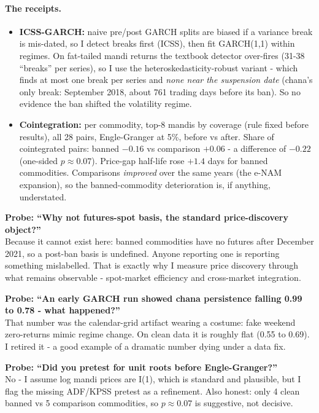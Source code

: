 \documentclass[11pt]{article}
\newcommand{\Q}[1]{\smallskip\noindent\textbf{Probe: #1}\\}
\begin{document}
\paragraph{The receipts.}
\begin{itemize}[leftmargin=1.6em,itemsep=1pt]
  \item \textbf{ICSS-GARCH:} naive pre/post GARCH splits are biased if a variance break is
        mis-dated, so I detect breaks first (ICSS), then fit GARCH(1,1) within regimes.
        On fat-tailed mandi returns the textbook detector over-fires (31-38 ``breaks'' per
        series), so I use the heteroskedasticity-robust variant - which finds at most one
        break per series and \emph{none near the suspension date} (chana's only break:
        September 2018, about 761 trading days before its ban). So no evidence the ban
        shifted the volatility regime.
  \item \textbf{Cointegration:} per commodity, top-8 mandis by coverage (rule fixed before
        results), all 28 pairs, Engle-Granger at 5\%, before vs after. Share of
        cointegrated pairs: banned $-0.16$ vs comparison $+0.06$ - a difference of
        $-0.22$ (one-sided $p\approx0.07$). Price-gap half-life rose $+1.4$ days for
        banned commodities. Comparisons \emph{improved} over the same years (the e-NAM
        expansion), so the banned-commodity deterioration is, if anything, understated.
\end{itemize}

\Q{``Why not futures-spot basis, the standard price-discovery object?''}
Because it cannot exist here: banned commodities have no futures after December 2021, so a
post-ban basis is undefined. Anyone reporting one is reporting something mislabelled. That
is exactly why I measure price discovery through what remains observable - spot-market
efficiency and cross-market integration.

\Q{``An early GARCH run showed chana persistence falling 0.99 to 0.78 - what happened?''}
That number was the calendar-grid artifact wearing a costume: fake weekend zero-returns
mimic regime change. On clean data it is roughly flat (0.55 to 0.69). I retired it - a
good example of a dramatic number dying under a data fix.

\Q{``Did you pretest for unit roots before Engle-Granger?''}
No - I assume log mandi prices are I(1), which is standard and plausible, but I flag the
missing ADF/KPSS pretest as a refinement. Also honest: only 4 clean banned vs 5 comparison
commodities, so $p\approx0.07$ is suggestive, not decisive.
\end{document}
